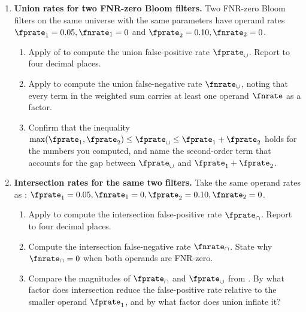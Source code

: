 \begin{enumerate}


\item \exstar
\label{ex:ch6-1}
\textbf{Union rates for two FNR-zero Bloom filters.}
Two FNR-zero Bloom filters on the same universe with the same parameters
have operand rates $\fprate_1 = 0.05, \fnrate_1 = 0$ and $\fprate_2 =
0.10, \fnrate_2 = 0$.
\begin{enumerate}
  \item[(a)] Apply  of  to
    compute the union false-positive rate $\fprate_\cup$. Report to
    four decimal places.
  \item[(b)] Apply  to compute the union
    false-negative rate $\fnrate_\cup$, noting that every term in the
    weighted sum carries at least one operand $\fnrate$ as a factor.
  \item[(c)] Confirm that the inequality
    $\max(\fprate_1, \fprate_2) \le \fprate_\cup \le \fprate_1 +
    \fprate_2$ holds for the numbers you computed, and name the
    second-order term that accounts for the gap between
    $\fprate_\cup$ and $\fprate_1 + \fprate_2$.
\end{enumerate}

\item \exstar
\label{ex:ch6-2}
\textbf{Intersection rates for the same two filters.}
Take the same operand rates as : $\fprate_1 = 0.05,
\fnrate_1 = 0, \fprate_2 = 0.10, \fnrate_2 = 0$.
\begin{enumerate}
  \item[(a)] Apply  to compute the
    intersection false-positive rate $\fprate_\cap$. Report to four
    decimal places.
  \item[(b)] Compute the intersection false-negative rate
    $\fnrate_\cap$. State why $\fnrate_\cap = 0$ when both operands
    are FNR-zero.
  \item[(c)] Compare the magnitudes of $\fprate_\cap$ and
    $\fprate_\cup$ from . By what factor does
    intersection reduce the false-positive rate relative to the
    smaller operand $\fprate_1$, and by what factor does union
    inflate it?
\end{enumerate}


\end{enumerate}

